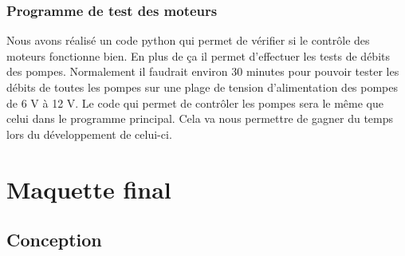 \documentclass[a4paper, 11pt]{article}
\begin{document}
\subsubsection{Programme de test des moteurs}
Nous avons réalisé un code python qui permet de vérifier si le contrôle des moteurs fonctionne bien.
En plus de ça il permet d'effectuer les tests de débits des pompes.
Normalement il faudrait environ 30 minutes pour pouvoir tester les débits de toutes les pompes sur une plage de tension d'alimentation des pompes de 6 V à 12 V.
Le code qui permet de contrôler les pompes sera le même que celui dans le programme principal.
Cela va nous permettre de gagner du temps lors du développement de celui-ci.
\newpage
\section{Maquette final}
\subsection{Conception}
%
\printbibliography
\end{document}
